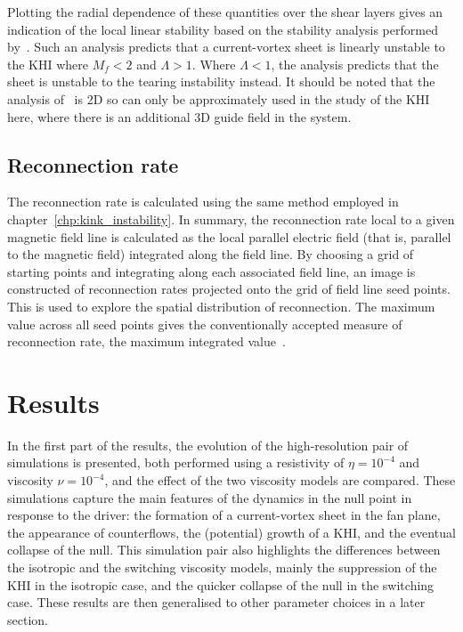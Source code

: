 Plotting the radial dependence of these quantities over the shear layers gives an indication of the local linear stability based on the stability analysis performed by~\cite{einaudiResistiveInstabilitiesFlowing1986}. Such an analysis predicts that a current-vortex sheet is linearly unstable to the KHI where $M_f < 2$ and $\Lambda > 1$. Where $\Lambda < 1$, the analysis predicts that the sheet is unstable to the tearing instability instead. It should be noted that the analysis of~\cite{einaudiResistiveInstabilitiesFlowing1986} is 2D so can only be approximately used in the study of the KHI here, where there is an additional 3D guide field in the system.

\subsection{Reconnection rate}

The reconnection rate is calculated using the same method employed in chapter~\ref{chp:kink_instability}. In summary, the reconnection rate local to a given magnetic field line is calculated as the local parallel electric field (that is, parallel to the magnetic field) integrated along the field line. By choosing a grid of starting points and integrating along each associated field line, an image is constructed of reconnection rates projected onto the grid of field line seed points. This is used to explore the spatial distribution of reconnection. The maximum value across all seed points gives the conventionally accepted measure of reconnection rate, the maximum integrated value~\cite{galsgaardSteadyStateReconnection2011,priestNatureThreedimensionalMagnetic2003,schindlerGeneralMagneticReconnection1988}.

\section{Results}

\label{sec:khi_results}

In the first part of the results, the evolution of the high-resolution pair of simulations is presented, both performed using a resistivity of $\eta = 10^{-4}$ and viscosity $\nu = 10^{-4}$, and the effect of the two viscosity models are compared. These simulations capture the main features of the dynamics in the null point in response to the driver: the formation of a current-vortex sheet in the fan plane, the appearance of counterflows, the (potential) growth of a KHI, and the eventual collapse of the null. This simulation pair also highlights the differences between the isotropic and the switching viscosity models, mainly the suppression of the KHI in the isotropic case, and the quicker collapse of the null in the switching case. These results are then generalised to other parameter choices in a later section.

